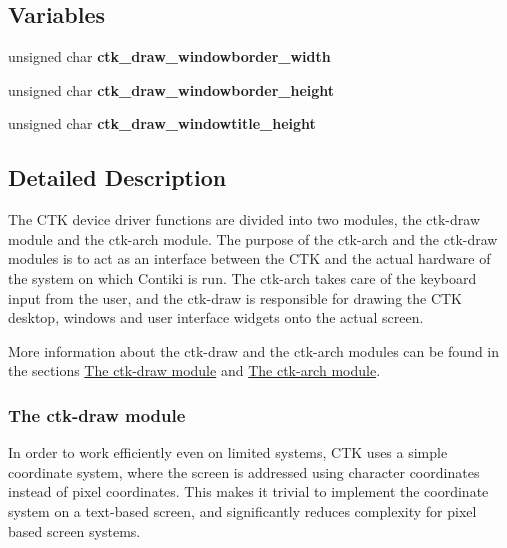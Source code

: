 \subsection*{Variables}
\begin{DoxyCompactItemize}
\item 
\hypertarget{group__ctkdraw_ga9e116d894f9f5823092910e77b8224e0}{}unsigned char {\bfseries ctk\+\_\+draw\+\_\+windowborder\+\_\+width}\label{group__ctkdraw_ga9e116d894f9f5823092910e77b8224e0}

\item 
\hypertarget{group__ctkdraw_ga90e742edc8b359a73f02699c84d921e2}{}unsigned char {\bfseries ctk\+\_\+draw\+\_\+windowborder\+\_\+height}\label{group__ctkdraw_ga90e742edc8b359a73f02699c84d921e2}

\item 
\hypertarget{group__ctkdraw_ga60d13ead987fe40807293206478b207f}{}unsigned char {\bfseries ctk\+\_\+draw\+\_\+windowtitle\+\_\+height}\label{group__ctkdraw_ga60d13ead987fe40807293206478b207f}

\end{DoxyCompactItemize}


\subsection{Detailed Description}
The C\+T\+K device driver functions are divided into two modules, the ctk-\/draw module and the ctk-\/arch module. The purpose of the ctk-\/arch and the ctk-\/draw modules is to act as an interface between the C\+T\+K and the actual hardware of the system on which Contiki is run. The ctk-\/arch takes care of the keyboard input from the user, and the ctk-\/draw is responsible for drawing the C\+T\+K desktop, windows and user interface widgets onto the actual screen.

More information about the ctk-\/draw and the ctk-\/arch modules can be found in the sections \hyperlink{group__ctkdraw}{The ctk-\/draw module} and \hyperlink{group__ctkdraw}{The ctk-\/arch module}. \hypertarget{ctk-draw}{}\subsubsection{The ctk-\/draw module}\label{ctk-draw}
In order to work efficiently even on limited systems, C\+T\+K uses a simple coordinate system, where the screen is addressed using character coordinates instead of pixel coordinates. This makes it trivial to implement the coordinate system on a text-\/based screen, and significantly reduces complexity for pixel based screen systems.

